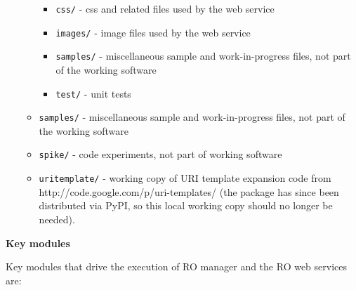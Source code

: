 \documentclass[11pt,oneside]{article}
\begin{document}
\begin{itemize}
\begin{itemize}
\begin{itemize}
\item \texttt{css/} - css and related files used by the web service
\item \texttt{images/} - image files used by the web service
\item \texttt{samples/} - miscellaneous sample and work-in-progress files, not part of the working software
\item \texttt{test/} - unit tests
\end{itemize}


\item \texttt{samples/} - miscellaneous sample and work-in-progress files, not part of the working software
\item \texttt{spike/} - code experiments, not part of working software
\item \texttt{uritemplate/} - working copy of URI template expansion code from http://code.google.com/p/uri-templates/ (the package has since been distributed via PyPI, so this local working copy should no longer be needed).
\end{itemize}


\end{itemize}

\textbf{Key modules}
\label{keymodules}

Key modules that drive the execution of RO manager and the RO web services are:
\end{document}
